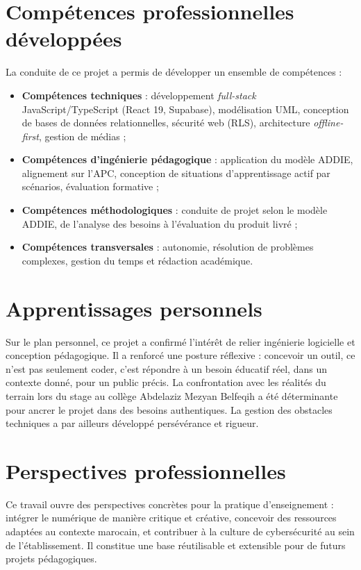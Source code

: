 \documentclass[12pt, a4paper, oneside]{report}
\begin{document}
\section*{Compétences professionnelles développées}
La conduite de ce projet a permis de développer un ensemble de compétences :
\begin{itemize}[leftmargin=*]
  \item \textbf{Compétences techniques} : développement \textit{full-stack} JavaScript/TypeScript (React 19, Supabase), modélisation UML, conception de bases de données relationnelles, sécurité web (RLS), architecture \textit{offline-first}, gestion de médias ;
  \item \textbf{Compétences d'ingénierie pédagogique} : application du modèle ADDIE, alignement sur l'APC, conception de situations d'apprentissage actif par scénarios, évaluation formative ;
  \item \textbf{Compétences méthodologiques} : conduite de projet selon le modèle ADDIE, de l'analyse des besoins à l'évaluation du produit livré ;
  \item \textbf{Compétences transversales} : autonomie, résolution de problèmes complexes, gestion du temps et rédaction académique.
\end{itemize}

\section*{Apprentissages personnels}
Sur le plan personnel, ce projet a confirmé l'intérêt de relier ingénierie logicielle et conception pédagogique. Il a renforcé une posture réflexive : concevoir un outil, ce n'est pas seulement coder, c'est répondre à un besoin éducatif réel, dans un contexte donné, pour un public précis. La confrontation avec les réalités du terrain lors du stage au collège Abdelaziz Mezyan Belfeqih a été déterminante pour ancrer le projet dans des besoins authentiques. La gestion des obstacles techniques a par ailleurs développé persévérance et rigueur.

\section*{Perspectives professionnelles}
Ce travail ouvre des perspectives concrètes pour la pratique d'enseignement : intégrer le numérique de manière critique et créative, concevoir des ressources adaptées au contexte marocain, et contribuer à la culture de cybersécurité au sein de l'établissement. Il constitue une base réutilisable et extensible pour de futurs projets pédagogiques.
\end{document}
